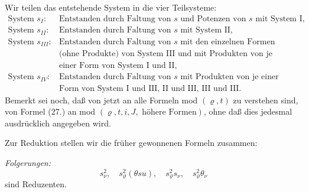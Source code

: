 Wir teilen das entstehende System in die vier Teilsysteme:
\[
\begin{array}{ll}
\text{System }s_I:&\text{Entstanden durch Faltung von }s\text{ und Potenzen von }s\text{ mit System I,}\\
\text{System }s_{II}:&\text{Entstanden durch Faltung von }s\text{ mit System II,}\\
\text{System }s_{III}:&\text{Entstanden durch Faltung von }s\text{ mit den einzelnen Formen}\\
&\text{(ohne Produkte) von System III und mit Produkten von je}\\
&\text{einer Form von System I und II,}\\
\text{System }s_{IV}:&\text{Entstanden durch Faltung von }s\text{ mit Produkten von je einer}\\
&\text{Form von System I und III, II und III, III und III.}
\end{array}
\]
Bemerkt sei noch, daß von jetzt an alle Formeln mod $(\varrho,t)$ zu verstehen sind, von Formel (27.) an mod $(\varrho,t,i,J,\text{ höhere Formen})$, ohne daß dies jedesmal ausdrücklich angegeben wird.

Zur Reduktion stellen wir die früher gewonnenen Formeln zusammen:

\noindent\emph{Folgerungen:}
\[
 s_\nu^2,\quad s_\vartheta^2(\theta su),\quad s_\vartheta^2s_\nu,\quad s_\vartheta^2\theta_\nu
\]
sind Reduzenten.

